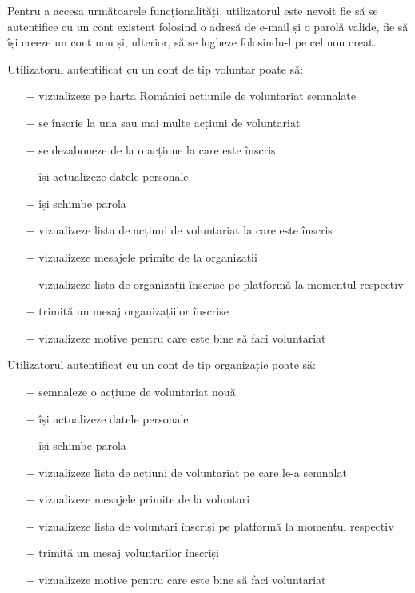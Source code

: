 \documentclass[12pt,a4paper]{report}
\begin{document}
\bigskip
Pentru a accesa următoarele funcționalități, utilizatorul este nevoit fie să se autentifice cu un cont existent folosind o adresă de e-mail și o parolă valide, fie să își creeze un cont nou și, ulterior, să se logheze folosindu-l pe cel nou creat.
\\ \par
Utilizatorul autentificat cu un cont de tip voluntar poate să:
\\
\begin{itemize}
    \item[$-$] vizualizeze pe harta României acțiunile de voluntariat semnalate 
    \item[$-$] se înscrie la una sau mai multe acțiuni de voluntariat
    \item[$-$] se dezaboneze de la o acțiune la care este înscris
    \item[$-$] își actualizeze datele personale
    \item[$-$] își schimbe parola
    \item[$-$] vizualizeze lista de acțiuni de voluntariat la care este înscris
    \item[$-$] vizualizeze mesajele primite de la organizații
    \item[$-$] vizualizeze lista de organizații înscrise pe platformă la momentul respectiv
    \item[$-$] trimită un mesaj organizațiilor înscrise
    \item[$-$] vizualizeze motive pentru care este bine să faci voluntariat
\end{itemize}

\newpage
Utilizatorul autentificat cu un cont de tip organizație poate să:
\\
\begin{itemize}
    \item[$-$] semnaleze o acțiune de voluntariat nouă
    \item[$-$] își actualizeze datele personale
    \item[$-$] își schimbe parola
    \item[$-$] vizualizeze lista de acțiuni de voluntariat pe care le-a semnalat
    \item[$-$] vizualizeze mesajele primite de la voluntari
    \item[$-$] vizualizeze lista de voluntari înscriși pe platformă la momentul respectiv
    \item[$-$] trimită un mesaj voluntarilor înscriși
    \item[$-$] vizualizeze motive pentru care este bine să faci voluntariat
\end{itemize}
\end{document}
